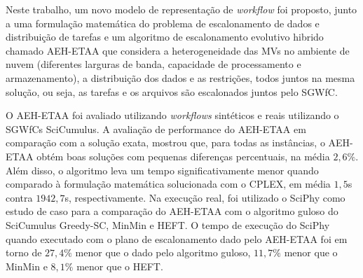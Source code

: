 
Neste trabalho, um novo modelo de representação de \textit{workflow} foi proposto, junto a uma formulação matemática do problema de escalonamento de dados e distribuição de tarefas e um algoritmo de escalonamento evolutivo hibrido chamado AEH-ETAA que considera a heterogeneidade das MVs no ambiente de nuvem (diferentes larguras de banda, capacidade de processamento e armazenamento), a distribuição dos dados e as restrições, todos juntos na mesma solução, ou seja, as tarefas e os arquivos são escalonados juntos pelo SGWfC.


O AEH-ETAA foi avaliado utilizando \textit{workflows} sintéticos e reais utilizando o SGWfCs SciCumulus. A avaliação de performance do AEH-ETAA em comparação com a solução exata, mostrou que, para todas as instâncias, o AEH-ETAA obtém boas soluções com pequenas diferenças percentuais, na média $2,6\%$. Além disso, o algoritmo  leva um tempo significativamente menor quando comparado à formulação matemática solucionada com o CPLEX, em média $1,5$s contra $1942,7$s, respectivamente. Na execução real, foi utilizado o SciPhy como estudo de caso para a comparação do AEH-ETAA com o algoritmo guloso do SciCumulus Greedy-SC, MinMin e HEFT. O tempo de execução do SciPhy quando executado com o plano de escalonamento dado pelo AEH-ETAA foi em torno de $27,4\%$ menor que o dado pelo algoritmo guloso, $11,7\%$ menor que o MinMin e $8,1\%$ menor que o HEFT. 

